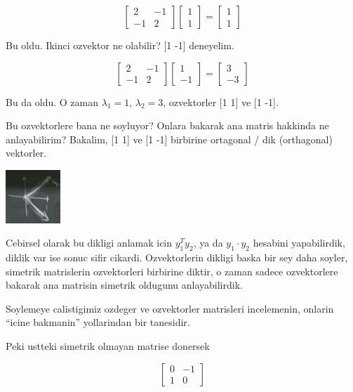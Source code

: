 \documentclass[12pt,fleqn]{article}\usepackage{../common}
\begin{document}
\[ 
\left[\begin{array}{rr}
2 & -1 \\
-1 & 2
\end{array}\right]
\left[\begin{array}{c}
1 \\
1
\end{array}\right]
=
\left[\begin{array}{c}
1 \\
1
\end{array}\right]
 \]

Bu oldu. Ikinci ozvektor ne olabilir? [1 -1] deneyelim. 

\[ 
\left[\begin{array}{rr}
2 & -1 \\
-1 & 2
\end{array}\right]
\left[\begin{array}{r}
1 \\
-1
\end{array}\right]
=
\left[\begin{array}{r}
3 \\
-3
\end{array}\right]
 \]

Bu da oldu. O zaman $\lambda_1 = 1$, $\lambda_2 = 3$, ozvektorler [1 1] ve
[1 -1]. 

Bu ozvektorlere bana ne soyluyor? Onlara bakarak ana matris hakkinda ne
anlayabilirim? Bakalim, [1 1] ve [1 -1] birbirine ortagonal / dik
(orthagonal) vektorler. 

\includegraphics[height=2cm]{5_5.png}

Cebirsel olarak bu dikligi anlamak icin $y_1^Ty_2$, ya da $y_1 \cdot y_2$
hesabini yapabilirdik, diklik var ise sonuc sifir cikardi. Ozvektorlerin
dikligi baska bir sey daha soyler, simetrik matrislerin ozvektorleri
birbirine diktir, o zaman sadece ozvektorlere bakarak ana matrisin simetrik
oldugunu anlayabilirdik.

Soylemeye calistigimiz ozdeger ve ozvektorler matrisleri incelemenin,
onlarin ``icine bakmanin'' yollarindan bir tanesidir. 

Peki ustteki simetrik olmayan matrise donersek

\[ 
\left[
\begin{array}{rr}
0 & -1 \\
1 & 0
\end{array}
\right]
 \]
\end{document}
